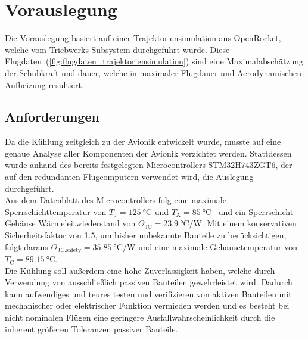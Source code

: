 \chapter{Vorauslegung}
\label{chap:Vorauslegung}
Die Vorauslegung basiert auf einer Trajektoriensimulation aus OpenRocket, welche vom Triebwerks-Subsystem durchgeführt wurde.
Diese Flugdaten~(\ref{fig:flugdaten_trajektoriensimulation}) sind eine Maximalabschätzung der Schubkraft und dauer, welche in maximaler Flugdauer und Aerodynamischen Aufheizung
resultiert.

\section{Anforderungen}

Da die Kühlung zeitgleich zu der Avionik entwickelt wurde, musste auf eine genaue Analyse aller Komponenten der Avionik verzichtet werden.
Stattdessen wurde anhand des bereits festgelegten Microcontrollers STM32H743ZGT6, der auf den redundanten Flugcomputern verwendet wird,
die Auslegung durchgeführt.\\
Aus dem Datenblatt des Microcontrollers folg eine maximale Sperrschichttemperatur von $T_\text{J} = \SI{125}{\degreeCelsius}$ und $T_\text{A} = \SI{85}{\degreeCelsius}$~\cite{STM32}
und ein Sperrschicht-Gehäuse Wärmeleitwiederstand von $\Theta_\text{JC} = \SI{23.9}{\degreeCelsius\per\watt}$. Mit einem konservativen
Sicherheitsfaktor von 1.5, um bisher unbekannte Bauteile zu berücksichtigen, folgt daraus $\Theta_\text{JC,safety} = \SI{35.85}{\degreeCelsius\per\watt}$
und eine maximale Gehäusetemperatur von $T_\text{C} = \SI{89.15}{\degreeCelsius}$.\\

Die Kühlung soll außerdem eine hohe Zuverlässigkeit haben, welche durch Verwendung von ausschließlich passiven Bauteilen gewehrleistet wird.
Dadurch kann aufwendiges und teures testen und verifizieren von aktiven Bauteilen mit mechanischer oder elektrischer Funktion vermieden werden und es besteht bei
nicht nominalen Flügen eine geringere Ausfallwahrscheinlichkeit durch die inherent größeren Toleranzen passiver Bauteile.

